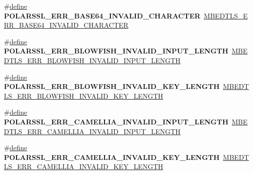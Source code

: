 \begin{DoxyCompactItemize}
\#\hyperlink{structdefine}{define} {\bfseries P\+O\+L\+A\+R\+S\+S\+L\+\_\+\+E\+R\+R\+\_\+\+B\+A\+S\+E64\+\_\+\+I\+N\+V\+A\+L\+I\+D\+\_\+\+C\+H\+A\+R\+A\+C\+T\+ER}~\hyperlink{base64_8h_a954f9cf059a6c6be1a3b93480f9a561d}{M\+B\+E\+D\+T\+L\+S\+\_\+\+E\+R\+R\+\_\+\+B\+A\+S\+E64\+\_\+\+I\+N\+V\+A\+L\+I\+D\+\_\+\+C\+H\+A\+R\+A\+C\+T\+ER}
\item 
\mbox{\label{compat-1_83_8h_a776d91162e4c250f4b2625884e52a54f}} 
\#\hyperlink{structdefine}{define} {\bfseries P\+O\+L\+A\+R\+S\+S\+L\+\_\+\+E\+R\+R\+\_\+\+B\+L\+O\+W\+F\+I\+S\+H\+\_\+\+I\+N\+V\+A\+L\+I\+D\+\_\+\+I\+N\+P\+U\+T\+\_\+\+L\+E\+N\+G\+TH}~\hyperlink{blowfish_8h_a279c1b5f0ab064fc6591a3ca324f3830}{M\+B\+E\+D\+T\+L\+S\+\_\+\+E\+R\+R\+\_\+\+B\+L\+O\+W\+F\+I\+S\+H\+\_\+\+I\+N\+V\+A\+L\+I\+D\+\_\+\+I\+N\+P\+U\+T\+\_\+\+L\+E\+N\+G\+TH}
\item 
\mbox{\label{compat-1_83_8h_a56226b271b174aba0746c23d2d085a74}} 
\#\hyperlink{structdefine}{define} {\bfseries P\+O\+L\+A\+R\+S\+S\+L\+\_\+\+E\+R\+R\+\_\+\+B\+L\+O\+W\+F\+I\+S\+H\+\_\+\+I\+N\+V\+A\+L\+I\+D\+\_\+\+K\+E\+Y\+\_\+\+L\+E\+N\+G\+TH}~\hyperlink{blowfish_8h_ada258472bd81338e8dc2d3361487a51b}{M\+B\+E\+D\+T\+L\+S\+\_\+\+E\+R\+R\+\_\+\+B\+L\+O\+W\+F\+I\+S\+H\+\_\+\+I\+N\+V\+A\+L\+I\+D\+\_\+\+K\+E\+Y\+\_\+\+L\+E\+N\+G\+TH}
\item 
\mbox{\label{compat-1_83_8h_a0638bc59431e0d199ffc8353feb738aa}} 
\#\hyperlink{structdefine}{define} {\bfseries P\+O\+L\+A\+R\+S\+S\+L\+\_\+\+E\+R\+R\+\_\+\+C\+A\+M\+E\+L\+L\+I\+A\+\_\+\+I\+N\+V\+A\+L\+I\+D\+\_\+\+I\+N\+P\+U\+T\+\_\+\+L\+E\+N\+G\+TH}~\hyperlink{camellia_8h_a66cfdf3e866ec31afd789eedbd6a6883}{M\+B\+E\+D\+T\+L\+S\+\_\+\+E\+R\+R\+\_\+\+C\+A\+M\+E\+L\+L\+I\+A\+\_\+\+I\+N\+V\+A\+L\+I\+D\+\_\+\+I\+N\+P\+U\+T\+\_\+\+L\+E\+N\+G\+TH}
\item 
\mbox{\label{compat-1_83_8h_a8bbda0567c613d789430c69ba5069fad}} 
\#\hyperlink{structdefine}{define} {\bfseries P\+O\+L\+A\+R\+S\+S\+L\+\_\+\+E\+R\+R\+\_\+\+C\+A\+M\+E\+L\+L\+I\+A\+\_\+\+I\+N\+V\+A\+L\+I\+D\+\_\+\+K\+E\+Y\+\_\+\+L\+E\+N\+G\+TH}~\hyperlink{camellia_8h_a83ded8bd01f48f4946b788166b6e839b}{M\+B\+E\+D\+T\+L\+S\+\_\+\+E\+R\+R\+\_\+\+C\+A\+M\+E\+L\+L\+I\+A\+\_\+\+I\+N\+V\+A\+L\+I\+D\+\_\+\+K\+E\+Y\+\_\+\+L\+E\+N\+G\+TH}
\item 
\mbox{\label{compat-1_83_8h_a51ba7afc7f66aa40e849813869c5d402}} 

\end{DoxyCompactItemize}
